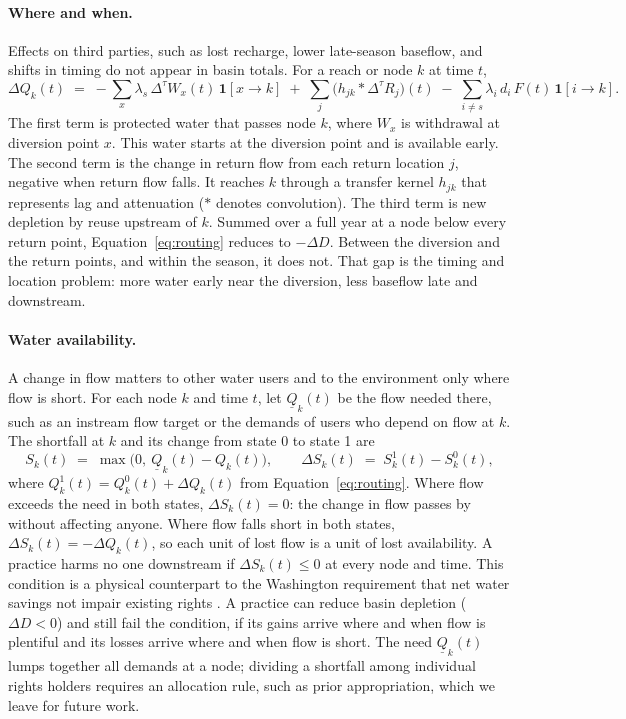 \documentclass[11pt]{article}
\newcommand{\dtau}{\Delta^{\tau}}            %
\newcommand{\ind}{\mathbf{1}}               %
\begin{document}
\paragraph{Where and when.} Effects on third parties, such as lost recharge, lower late-season baseflow, and shifts in timing do not appear in basin totals. For a reach or node $k$ at time $t$,
\begin{equation}\label{eq:routing}
  \Delta Q_k(t) \;=\; -\sum_{x} \lambda_s\, \dtau W_x(t)\,\ind[x \to k]
  \;+\; \sum_{j} \big(h_{jk} * \dtau R_j\big)(t)
  \;-\; \sum_{i\neq s} \lambda_i\, d_i\, F(t)\,\ind[i \to k] .
\end{equation}
The first term is protected water that passes node $k$, where $W_x$ is withdrawal at diversion point $x$. This water starts at the diversion point and is available early. The second term is the change in return flow from each return location $j$, negative when return flow falls. It reaches $k$ through a transfer kernel $h_{jk}$ that represents lag and attenuation ($*$ denotes convolution). The third term is new depletion by reuse upstream of $k$. Summed over a full year at a node below every return point, Equation~\eqref{eq:routing} reduces to $-\Delta D$. Between the diversion and the return points, and within the season, it does not. That gap is the timing and location problem: more water early near the diversion, less baseflow late and downstream.

\paragraph{Water availability.} A change in flow matters to other water users and to the environment only where flow is short. For each node $k$ and time $t$, let $\underline{Q}_k(t)$ be the flow needed there, such as an instream flow target or the demands of users who depend on flow at $k$. The shortfall at $k$ and its change from state 0 to state 1 are
\begin{equation}\label{eq:shortfall}
  S_k(t) \;=\; \max\big(0,\ \underline{Q}_k(t) - Q_k(t)\big) ,
  \qquad
  \Delta S_k(t) \;=\; S^1_k(t) - S^0_k(t) ,
\end{equation}
where $Q^1_k(t) = Q^0_k(t) + \Delta Q_k(t)$ from Equation~\eqref{eq:routing}. Where flow exceeds the need in both states, $\Delta S_k(t) = 0$: the change in flow passes by without affecting anyone. Where flow falls short in both states, $\Delta S_k(t) = -\Delta Q_k(t)$, so each unit of lost flow is a unit of lost availability. A practice harms no one downstream if $\Delta S_k(t) \le 0$ at every node and time. This condition is a physical counterpart to the Washington requirement that net water savings not impair existing rights \citep{rcw9042020}. A practice can reduce basin depletion ($\Delta D < 0$) and still fail the condition, if its gains arrive where and when flow is plentiful and its losses arrive where and when flow is short. The need $\underline{Q}_k(t)$ lumps together all demands at a node; dividing a shortfall among individual rights holders requires an allocation rule, such as prior appropriation, which we leave for future work.
\end{document}
